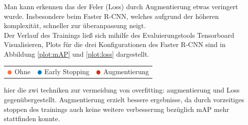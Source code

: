 \begin{table}[H]
\begin{tabular}{m{}m{}|m{}<{\centering}m{}<{\centering}}
  \end{tabular}
\end{table}

Man kann erkennen das der Feler (Loss) durch Augmentierung etwas 
veringert wurde.
Insbesondere beim Faster R-CNN, welches aufgrund der 
höheren komplexität, schneller zur überanpassung neigt.\\
Der Verlauf des Trainings ließ sich mihilfe des Evaluierungstools Tensorboard
Visualisieren, Plots für die drei Konfigurationen des Faster R-CNN sind in 
Abbildung \ref{plot:mAP} und \ref{plot:loss} dargestellt.
\vspace{0.5cm}

\begin{figure}[htb]
\begin{minipage}{0.5\textwidth}
  \centering
  \label{plot:mAP}
  \def\svgwidth{0.9\textwidth}
  
\end{minipage}
\begin{minipage}{0.5\textwidth}
  \centering
  \label{plot:Loss}
  \def\svgwidth{0.9\textwidth}
  
\end{minipage}
\end{figure}

\begin{table}[htb]
  \centering
  \begin{tabular}{m{}<{\centering}m{}<{\centering}m{}<{\centering}}
    $\color[HTML]{FF7043}\medbullet$  Ohne & $\color[HTML]{0077BB}\medbullet$  Early Stopping & $\color[HTML]{CC3311}\medbullet$  Augmentierung
  \end{tabular}    
\end{table}




hier die zwi techniken zur vermeidung von overfitting: augmentierung
und Loss gegenübergestellt. Augmentierung erzielt bessere ergebnisse, 
da durch vorzeitiges stoppen des trainings auch keine weitere verbesserung
bezüglich mAP mehr stattfinden konnte.




